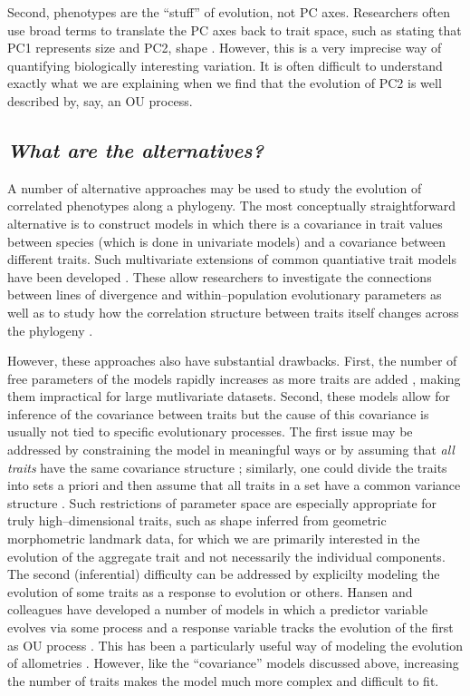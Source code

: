 \documentclass[a4paper,12pt]{article}
\begin{document}
Second, phenotypes are the ``stuff'' of evolution, not PC axes. Researchers often use broad terms to translate the PC axes back to trait space, such as stating that PC1 represents size and PC2, shape \citep[e.g.,][]{Harmon2010, Price2014}. However, this is a very imprecise way of quantifying biologically interesting variation. It is often difficult to understand exactly what we are explaining when we find that the evolution of PC2 is well described by, say, an OU process.

\subsection{\emph{What are the alternatives?}}

A number of alternative approaches may be used to study the evolution of correlated phenotypes along a phylogeny. The most conceptually straightforward alternative is to construct models in which there is a covariance in trait values between species (which is done in univariate models) and a covariance between different traits. Such multivariate extensions of common quantiative trait models have been developed \citep{RevellHarmon2008, Hohenlohe2008, RevellCollar2009, ButlerKing2009, motmot}. These allow researchers to investigate the connections between lines of divergence and within--population evolutionary parameters \citep{Hohenlohe2008} as well as to study how the correlation structure between traits itself changes across the phylogeny \citep{RevellCollar2009}. 

However, these approaches also have substantial drawbacks. First, the number of free parameters of the models rapidly increases as more traits are added \citep{RevellHarmon2008}, making them impractical for large mutlivariate datasets. Second, these models allow for inference of the covariance between traits but the cause of this covariance is usually not tied to specific evolutionary processes. The first issue may be addressed by constraining the model in meaningful ways \citep{ButlerKing2009} or by assuming that \emph{all traits} have the same covariance structure \citep{Adams2014, Adams2014b}; similarly, one could divide the traits into sets a priori and then assume that all traits in a set have a common variance structure \citep{Klingenberg2013}. Such restrictions of parameter space are especially appropriate for truly high--dimensional traits, such as shape inferred from geometric morphometric landmark data, for which we are primarily interested in the evolution of the aggregate trait and not necessarily the individual components. The second (inferential) difficulty can be addressed by explicilty modeling the evolution of some traits as a response to evolution or others. Hansen and colleagues have developed a number of models in which a predictor variable evolves via some process and a response variable tracks the evolution of the first as OU process \citep{Hansen2008, Labra2009, Hansen2012SysBio, Bartoszek2012}. This has been a particularly useful way of modeling the evolution of allometries \citep{Hansen2012SysBio, Voje2013, Voje2013b}. However, like the ``covariance''  models discussed above, increasing the number of traits makes the model much more complex and difficult to fit.
\end{document}
